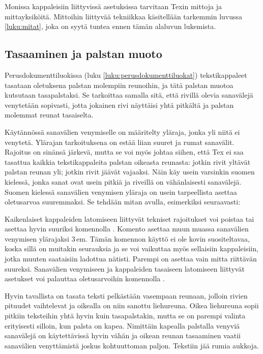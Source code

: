 Monissa kappaleisiin liittyvissä asetuksissa tarvitaan Texin mittoja ja
mittayksiköitä. Mittoihin liittyvää tekniikkaa käsitellään tarkemmin
luvussa \ref{luku:mitat}, joka on syytä tuntea ennen tämän alaluvun
lukemista.

\subsection{Tasaaminen ja palstan muoto}
\label{luku:kappaleen_tasaus}

Perusdokumenttiluokissa (luku \ref{luku:perusdokumenttiluokat})
tekstikappaleet tasataan oletuksena palstan molempiin reunoihin, ja tätä
palstan muotoa kutsutaan tasapalstaksi. Se tarkoittaa samalla sitä, että
rivillä olevia sanavälejä venytetään sopivasti, jotta jokainen rivi
näyttäisi yhtä pitkältä ja palstan molemmat reunat tasaiselta.

Käytännössä sanavälien venymiselle on määritelty yläraja, jonka yli
niitä ei venytetä. Ylärajan tarkoituksena on estää liian suuret ja rumat
sanavälit. Rajoitus on sinänsä järkevä, mutta se voi myös johtaa siihen,
että Tex ei saa tasattua kaikkia tekstikappaleita palstan oikeasta
reunasta: jotkin rivit yltävät palstan reunan yli; jotkin rivit jäävät
vajaaksi. Näin käy usein varsinkin suomen kielessä, jonka sanat ovat
usein pitkiä ja riveillä on vähänlaisesti sanavälejä. Suomen kielessä
sanavälien venymisen yläraja on usein tarpeellista asettaa oletusarvoa
suuremmaksi. Se tehdään mitan  avulla,
esimerkiksi seuraavasti:

\begin{koodilohkosis}
\setlength{\emergencystretch}{1em}
\end{koodilohkosis}

Kaikenlaiset kappaleiden latomiseen liittyvät tekniset rajoitukset voi
poistaa tai asettaa hyvin suuriksi komennolla . Komento
asettaa muun muassa sanavälien venymisen ylärajaksi 3\,em. Tämän
komennon käyttö ei ole kovin suositeltavaa, koska sillä on muitakin
seurauksia ja se voi vaikuttaa myös sellaisiin kappaleisiin, jotka
muuten saataisiin ladottua nätisti. Parempi on asettaa vain mitta
 riittävän suureksi. Sanavälien venymiseen ja
kappaleiden tasaiseen latomiseen liittyvät asetukset voi palauttaa
oletusarvoihin komennolla .

Hyvin tavallista on tasata teksti pelkästään vasempaan reunaan, jolloin
rivien pituudet vaihtelevat ja oikealla on niin sanottu liehureuna.
Oikea liehureuna sopii pitkiin teksteihin yhtä hyvin kuin tasapalstakin,
mutta se on parempi valinta erityisesti silloin, kun palsta on kapea.
Nimittäin kapealla palstalla venyviä sanavälejä on käytettävissä hyvin
vähän ja oikean reunan tasaaminen vaatii sanavälien venyttämistä joskus
kohtuuttoman paljon. Tekstiin jää rumia aukkoja.

